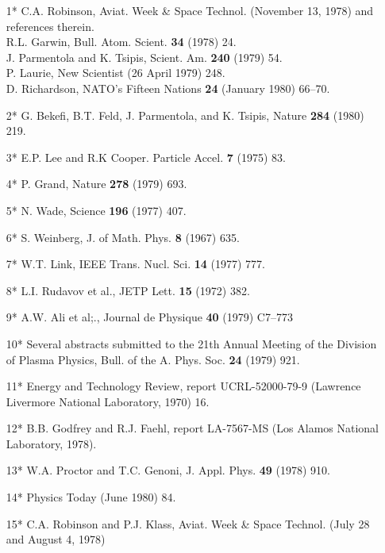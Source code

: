 \documentclass [12pt,a4paper,     ]{report} %
\begin{document}
\vspace{2\baselineskip}


\label{p-L}

\begin{enumerate}

\item[1*] C.A. Robinson, Aviat. Week \& Space Technol. (November 13, 1978) and references therein.\\ 
R.L. Garwin, Bull. Atom. Scient. {\bf 34} (1978) 24.\\
J. Parmentola and K. Tsipis, Scient. Am. {\bf 240} (1979) 54.\\
P. Laurie, New Scientist (26 April 1979) 248.\\
D. Richardson, NATO's Fifteen Nations {\bf 24} (January 1980) 66--70.

\item[2*] G. Bekefi, B.T. Feld, J. Parmentola, and K. Tsipis, Nature {\bf 284} (1980) 219.

\item[3*] E.P. Lee and R.K Cooper. Particle Accel. {\bf 7} (1975) 83.

\item[4*] P. Grand, Nature {\bf 278} (1979) 693.

\item[5*] N. Wade, Science {\bf 196} (1977) 407.

\item[6*] S. Weinberg, J. of Math. Phys. {\bf 8} (1967) 635.

\item[7*] W.T. Link, IEEE Trans. Nucl. Sci. {\bf 14} (1977) 777.

\item[8*] L.I. Rudavov et al., JETP Lett. {\bf 15} (1972) 382.

\item[9*] A.W. Ali et al;., Journal de Physique {\bf 40} (1979) C7--773

\item[10*] Several abstracts submitted to the 21th Annual Meeting of the Division of Plasma Physics, Bull. of the A. Phys. Soc. {\bf 24} (1979) 921.

\item[11*] Energy and Technology Review, report UCRL-52000-79-9 (Lawrence Livermore National Laboratory, 1970) 16.

\item[12*] B.B. Godfrey and R.J. Faehl, report LA-7567-MS (Los Alamos National Laboratory, 1978).

\item[13*] W.A. Proctor and T.C. Genoni, J. Appl. Phys. {\bf 49} (1978) 910.

\item[14*] Physics Today (June 1980) 84.

\item[15*] C.A. Robinson and P.J. Klass, Aviat. Week \& Space Technol. (July 28 and August 4, 1978)

\end{enumerate}
\end{document}
